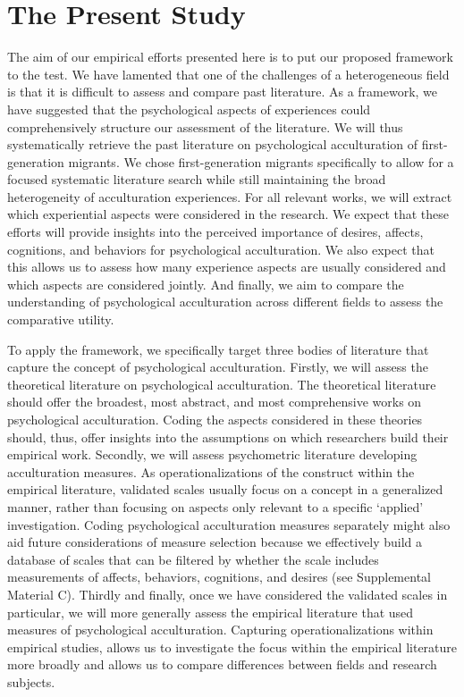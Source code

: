 \documentclass[man, 12pt, a4paper, mask]{apa7}
\newcommand\Warning[1][2ex]{%
  \renewcommand\stacktype{L}%
  \scaleto{\stackon[1.3pt]{\color{red}$\triangle$}{\tiny\bfseries !}}{#1}}%
\newcommand{\sidirectory}{Supplemental Material C}
\begin{document}
\section{The Present Study}


The aim of our empirical efforts presented here is to put our proposed framework to the test. We have lamented that one of the challenges of a heterogeneous field is that it is difficult to assess and compare past literature. As a framework, we have suggested that the psychological aspects of experiences could comprehensively structure our assessment of the literature. We will thus systematically retrieve the past literature on psychological acculturation of first-generation migrants. We chose first-generation migrants specifically to allow for a focused systematic literature search while still maintaining the broad heterogeneity of acculturation experiences. For all relevant works, we will extract which experiential aspects were considered in the research. We expect that these efforts will provide insights into the perceived importance of desires, affects, cognitions, and behaviors for psychological acculturation. We also expect that this allows us to assess how many experience aspects are usually considered and which aspects are considered jointly. And finally, we aim to compare the understanding of psychological acculturation across different fields to assess the comparative utility. 

To apply the framework, we specifically target three bodies of literature that capture the concept of psychological acculturation. Firstly, we will assess the theoretical literature on psychological acculturation. The theoretical literature should offer the broadest, most abstract, and most comprehensive works on psychological acculturation. Coding the aspects considered in these theories should, thus, offer insights into the assumptions on which researchers build their empirical work.
Secondly, we will assess psychometric literature developing acculturation measures. As operationalizations of the construct within the empirical literature, validated scales usually focus on a concept in a generalized manner, rather than focusing on aspects only relevant to a specific `applied' investigation. Coding psychological acculturation measures separately might also aid future considerations of measure selection because we effectively build a database of scales that can be filtered by whether the scale includes measurements of affects, behaviors, cognitions, and desires (see \sidirectory). 
Thirdly and finally, once we have considered the validated scales in particular, we will more generally assess the empirical literature that used measures of psychological acculturation. Capturing operationalizations within empirical studies, allows us to investigate the focus within the empirical literature more broadly and allows us to compare differences between fields and research subjects.
\end{document}
